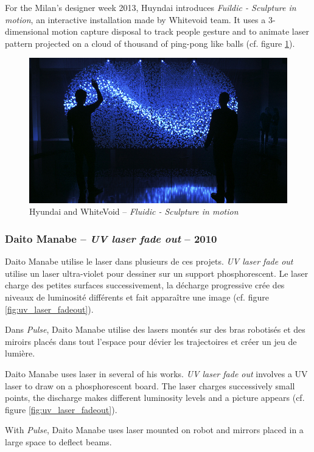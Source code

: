 \begin{en}
For the Milan's designer week 2013, Huyndai introduces \textit{Fuildic - Sculpture in motion}, an interactive installation made by Whitevoid team.
It uses a 3-dimensional motion capture disposal to track people gesture and to animate laser pattern projected on a cloud of thousand of ping-pong like balls (cf. figure \ref{fig:fluidic}).
\end{en}

\begin{figure}[ht]
\begin{center}
\includegraphics[width=\textwidth]{images/fluidic.jpg}
\end{center}
\caption{Hyundai and WhiteVoid -- \textit{Fluidic - Sculpture in motion}}
\label{fig:fluidic}
\end{figure}


\subsubsection{Daito Manabe -- \textit{UV laser fade out} -- 2010}
\begin{fr}
Daito Manabe utilise le laser dans plusieurs de ces projets.
\textit{UV laser fade out} utilise un laser ultra-violet pour dessiner sur un support phosphorescent. 
Le laser charge des petites surfaces successivement, la décharge progressive crée des niveaux de luminosité différents et fait apparaître une image (cf. figure \ref{fig:uv_laser_fadeout}).

Dans \textit{Pulse}, Daito Manabe utilise des lasers montés sur des bras robotisés et des miroirs placés dans tout l'espace pour dévier les trajectoires et créer un jeu de lumière.
\end{fr}

\begin{en}
Daito Manabe uses laser in several of his works.
\textit{UV laser fade out} involves a UV laser to draw on a phosphorescent board.
The laser charges successively small points, the discharge makes different luminosity levels and a picture appears (cf. figure \ref{fig:uv_laser_fadeout}).

With \textit{Pulse}, Daito Manabe uses laser mounted on robot and mirrors placed in a large space to deflect beams.
\end{en}

